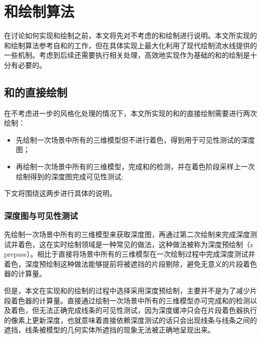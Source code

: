 \chapter{\con{}和\scon{}绘制算法}

在讨论如何实现\stc{}\con{}和\scon{}绘制之前，本文将先对不考虑\stcy{}的\con{}和\scon{}绘制进行说明。本文所实现的\con{}和\scon{}绘制算法参考自\citeauthor{northrup2000artistic}和\citeauthor{isenberg2002stylizing}的工作\cite{northrup2000artistic,isenberg2002stylizing}，但在具体实现上最大化利用了现代绘制流水线提供的一些机制。考虑到后续还需要执行\stc{}相关处理，高效地实现作为基础的\con{}和\scon{}的绘制是十分有必要的。

\section{\con{}和\scon{}的直接绘制}
\label{sec:basic}

在不考虑进一步的风格化处理的情况下，本文所实现的\con{}和\scon{}的直接绘制需要进行两次绘制：

\begin{itemize}
    \item 先绘制一次场景中所有的三维模型但不进行着色，得到用于可见性测试的深度图；
    \item 再绘制一次场景中所有的三维模型，完成\con{}和\scon{}的检测，并在着色阶段采样上一次绘制得到的深度图完成可见性测试;
\end{itemize}

下文将围绕这两步进行具体的说明。

\subsection{深度图与可见性测试}

先绘制一次场景中所有的三维模型来获取深度图，再通过第二次绘制来完成深度测试并着色，这在实时绘制领域是一种常见的做法，这种做法被称为深度预绘制（z prepass）。相比于直接将场景中所有的三维模型在一次绘制过程中完成深度测试并着色，深度预绘制这种做法能够提前将被遮挡的片段剔除，避免无意义的片段着色器的计算量。

但是，本文在实现\con{}和\scon{}的绘制的过程中选择采用深度预绘制，主要并不是为了减少片段着色器的计算量。直接通过绘制一次场景中所有的三维模型亦可完成\con{}和\scon{}的检测以及着色，但无法正确完成线条的可见性测试，因为深度缓冲只会在片段着色器执行的像素上更新深度，也就意味着直接依赖深度测试的话只会出现线条与线条之间的遮挡，线条被模型的几何实体所遮挡的现象无法被正确地呈现出来。

